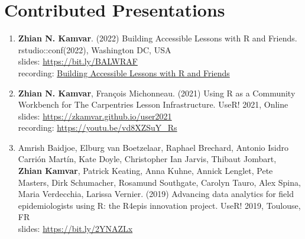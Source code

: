 



\section{Contributed Presentations}


\begin{enumerate}[leftmargin = 14pt]

  \item \textbf{Zhian N. Kamvar}. (2022) Building Accessible Lessons with R and
    Friends. rstudio::conf(2022), Washington DC, USA \\
    slides: \href{https://bit.ly/BALWRAF}{https://bit.ly/BALWRAF}\\
    recording: \href{https://www.rstudio.com/conference/2022/talks/building-accessible-lessons-r-friends/?wvideo=ssot3tfv28}{Building Accessible Lessons with R and Friends}

  \vspace{3pt}

  \item \textbf{Zhian N. Kamvar}, François Michonneau. (2021) Using R as a
    Community Workbench for The Carpentries Lesson Infrastructure. UseR! 2021,
    Online \\
    slides: \href{https://zkamvar.github.io/user2021}{https://zkamvar.github.io/user2021}\\
    recording: \href{https://youtu.be/vd8XZSuY\_Rs}{https://youtu.be/vd8XZSuY\_Rs}

  \vspace{3pt}

  \item Amrish Baidjoe, Elburg van Boetzelaar, Raphael Brechard, Antonio Isidro
    Carrión Martín, Kate Doyle, Christopher Ian Jarvis, Thibaut Jombart,
    \textbf{Zhian Kamvar}, Patrick Keating, Anna Kuhne, Annick Lenglet, Pete
    Masters, Dirk Schumacher, Rosamund Southgate, Carolyn Tauro, Alex Spina,
    Maria Verdecchia, Larissa Vernier. (2019) Advancing data analytics for
    field epidemiologists using R: the R4epis innovation project. UseR! 2019,
    Toulouse, FR\\
    slides: \href{https://bit.ly/2YNAZLx}{https://bit.ly/2YNAZLx}


\end{enumerate}

